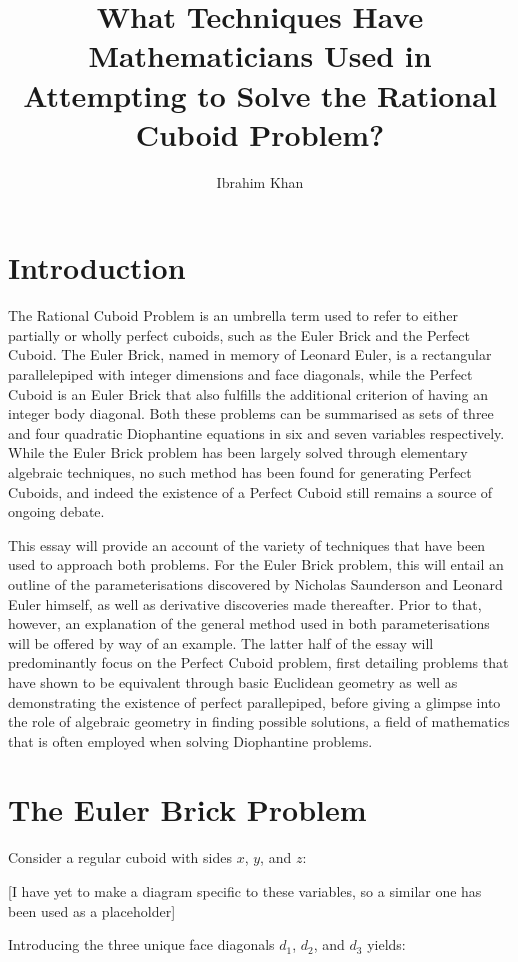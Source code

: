 \documentclass[11pt]{article}
\title{\textbf{What Techniques Have Mathematicians Used in Attempting to Solve the Rational Cuboid Problem?}}
\author{Ibrahim Khan}
\date{}
\begin{document}
\maketitle
\newpage
\tableofcontents
\newpage
\section{Introduction}
The Rational Cuboid Problem is an umbrella term used to refer to either partially or wholly perfect cuboids, such as the Euler Brick and the Perfect Cuboid. The Euler Brick, named in memory of Leonard Euler, is a rectangular parallelepiped with integer dimensions and face diagonals, while the Perfect Cuboid is an Euler Brick that also fulfills the additional criterion of having an integer body diagonal. Both these problems can be summarised as sets of three and four quadratic Diophantine equations in six and seven variables respectively. While the Euler Brick problem has been largely solved through elementary algebraic techniques, no such method has been found for generating Perfect Cuboids, and indeed the existence of a Perfect Cuboid still remains a source of ongoing debate. 

This essay will provide an account of the variety of techniques that have been used to approach both problems. For the Euler Brick problem, this will entail an outline of the parameterisations discovered by Nicholas Saunderson and Leonard Euler himself, as well as derivative discoveries made thereafter. Prior to that, however, an explanation of the general method used in both parameterisations will be offered by way of an example. The latter half of the essay will predominantly focus on the Perfect Cuboid problem, first detailing problems that have shown to be equivalent through basic Euclidean geometry as well as demonstrating the existence of perfect parallepiped, before giving a glimpse into the role of algebraic geometry in finding possible solutions, a field of mathematics that is often employed when solving Diophantine problems.

\section{The Euler Brick Problem}
Consider a regular cuboid with sides $x$, $y$, and $z$:

[I have yet to make a diagram specific to these variables, so a similar one has been used as a placeholder]

Introducing the three unique face diagonals $d_1$, $d_2$, and $d_3$ yields:
\end{document}
